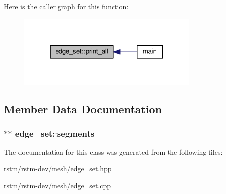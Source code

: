 Here is the caller graph for this function\-:
\nopagebreak
\begin{figure}[H]
\begin{center}
\leavevmode
\includegraphics[width=250pt]{classedge__set_aad055d2afc3506ec7b62e2a42414dc04_icgraph}
\end{center}
\end{figure}




\subsection{Member Data Documentation}
\hypertarget{classedge__set_a27bd0bf58ec76f7b3b1390c6fe8fe809}{
\subsubsection[{segments}]{$\ast$$\ast$ edge\-\_\-set\-::segments\hspace{0.3cm}{\ttfamily [private]}}}\label{classedge__set_a27bd0bf58ec76f7b3b1390c6fe8fe809}


The documentation for this class was generated from the following files\-:\begin{DoxyCompactItemize}
\item 
rstm/rstm-\/dev/mesh/\hyperlink{edge__set_8hpp}{edge\-\_\-set.\-hpp}\item 
rstm/rstm-\/dev/mesh/\hyperlink{edge__set_8cpp}{edge\-\_\-set.\-cpp}\end{DoxyCompactItemize}

